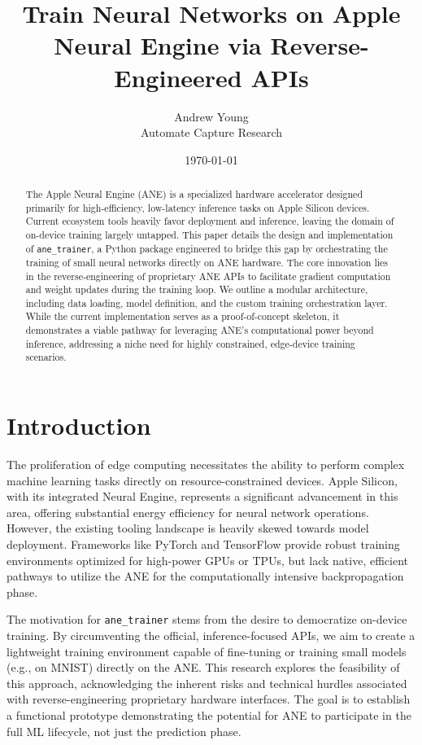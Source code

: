 \documentclass[11pt,a4paper]{article}
\title{Train Neural Networks on Apple Neural Engine via Reverse-Engineered APIs}
\author{Andrew Young \\ Automate Capture Research}
\date{\today}
\begin{document}
\maketitle

\begin{abstract}
The Apple Neural Engine (ANE) is a specialized hardware accelerator designed primarily for high-efficiency, low-latency inference tasks on Apple Silicon devices. Current ecosystem tools heavily favor deployment and inference, leaving the domain of on-device training largely untapped. This paper details the design and implementation of \texttt{ane\_trainer}, a Python package engineered to bridge this gap by orchestrating the training of small neural networks directly on ANE hardware. The core innovation lies in the reverse-engineering of proprietary ANE APIs to facilitate gradient computation and weight updates during the training loop. We outline a modular architecture, including data loading, model definition, and the custom training orchestration layer. While the current implementation serves as a proof-of-concept skeleton, it demonstrates a viable pathway for leveraging ANE's computational power beyond inference, addressing a niche need for highly constrained, edge-device training scenarios.
\end{abstract}

\section{Introduction}
The proliferation of edge computing necessitates the ability to perform complex machine learning tasks directly on resource-constrained devices. Apple Silicon, with its integrated Neural Engine, represents a significant advancement in this area, offering substantial energy efficiency for neural network operations. However, the existing tooling landscape is heavily skewed towards model deployment. Frameworks like PyTorch and TensorFlow provide robust training environments optimized for high-power GPUs or TPUs, but lack native, efficient pathways to utilize the ANE for the computationally intensive backpropagation phase.

The motivation for \texttt{ane\_trainer} stems from the desire to democratize on-device training. By circumventing the official, inference-focused APIs, we aim to create a lightweight training environment capable of fine-tuning or training small models (e.g., on MNIST) directly on the ANE. This research explores the feasibility of this approach, acknowledging the inherent risks and technical hurdles associated with reverse-engineering proprietary hardware interfaces. The goal is to establish a functional prototype demonstrating the potential for ANE to participate in the full ML lifecycle, not just the prediction phase.
\end{document}
